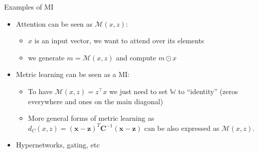 \documentclass[10pt]{beamer}
\begin{document}
\begin{frame}{Examples of MI}
    \begin{itemize}
        \item\pause Attention can be seen as $\mathcal{M}(x, z)$:
        \begin{itemize}
            \item\pause $x$ is an input vector, we want to attend over its elements
            \item\pause we generate $m = \mathcal{M}(x,z)$ and compute $m \odot x$
        \end{itemize}
        \item\pause Metric learning can be seen as a MI:
        \begin{itemize}
            \item\pause To have $\mathcal{M}(x,z) = z^\top x$ we just need to set $\mathbb{W}$ to ``identity'' (zeros everywhere and ones on the main diagonal)
            \item\pause More general forms of metric learning as $d_C(x,z) = (\mathbf{x}-\mathbf{z})^{T} \mathbf{C}^{-1}(\mathbf{x}-\mathbf{z})$ can be also expressed as $\mathcal{M}(x,z)$.
        \end{itemize}
        \item Hypernetworks, gating, etc
    \end{itemize}
\end{frame}
\end{document}
